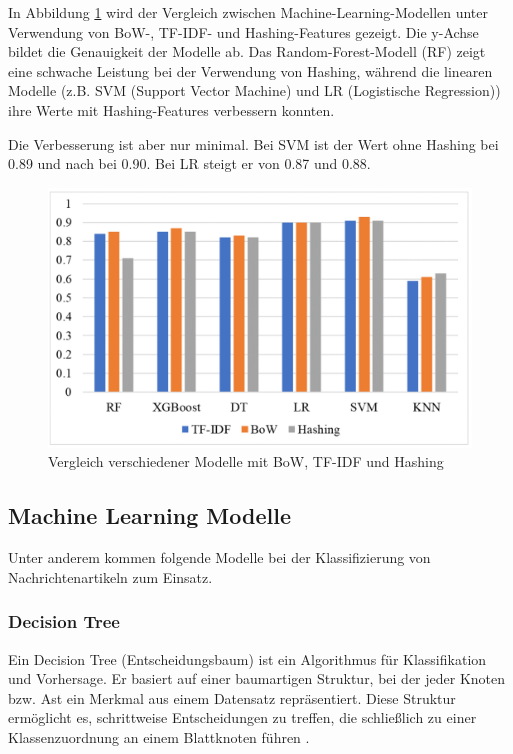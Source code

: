 In Abbildung \ref{fig:vgl_bow_tfidf_hashing} wird der Vergleich zwischen Machine-Learning-Modellen unter Verwendung von BoW-, TF-IDF- und
Hashing-Features gezeigt. Die y-Achse bildet die Genauigkeit der Modelle ab.
Das Random-Forest-Modell (RF) zeigt eine schwache Leistung bei der Verwendung von Hashing, während die linearen Modelle 
(z.B. SVM (Support Vector Machine) und LR (Logistische Regression)) ihre Werte mit Hashing-Features verbessern konnten. 

Die Verbesserung ist aber nur minimal. Bei SVM ist der Wert ohne Hashing bei 0.89 und nach bei 0.90. 
Bei LR steigt er von 0.87 und 0.88.

\begin{figure}[htbp]
    \begin{center}
        \includegraphics[scale=0.5]{static/bow_vs_tfidf_vs_hashing.png}
        \caption{\label{fig:vgl_bow_tfidf_hashing} Vergleich verschiedener Modelle mit BoW, TF-IDF und Hashing \cite{aslam2022}}
    \end{center}
\end{figure}

\subsection{Machine Learning Modelle}
\label{sec:ml_modelle}

Unter anderem kommen folgende Modelle bei der Klassifizierung von Nachrichtenartikeln zum Einsatz.

\subsubsection{Decision Tree}

Ein Decision Tree (Entscheidungsbaum) ist ein Algorithmus für Klassifikation und Vorhersage. 
Er basiert auf einer baumartigen Struktur, bei der jeder Knoten bzw. Ast ein Merkmal aus einem Datensatz repräsentiert. 
Diese Struktur ermöglicht es, schrittweise Entscheidungen zu treffen, die schließlich zu einer Klassenzuordnung an einem Blattknoten führen \cite{10.3389/frai.2023.1124553}.

